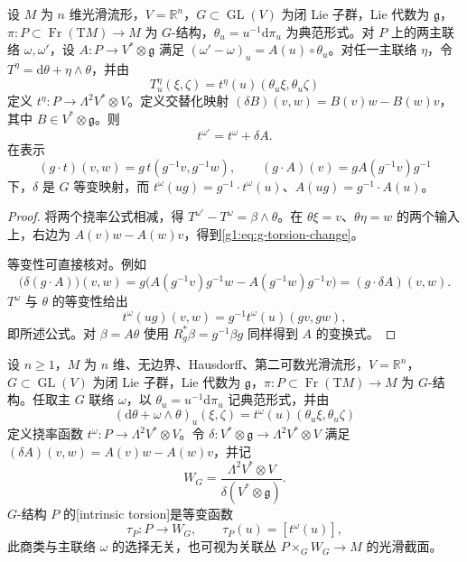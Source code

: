 \begin{proposition}
	\label{g1:prop:g-torsion-change}
	设 \(M\) 为 \(n\) 维光滑流形，\(V=\mathbb R^n\)，\(G\subset\operatorname{GL}(V)\) 为闭 Lie 子群，Lie 代数为 \(\mathfrak g\)，\(\pi:P\subset\operatorname{Fr}(\mathrm TM)\to M\) 为 \(G\)-结构，\(\theta_u=u^{-1}\mathrm d\pi_u\) 为典范形式。对 \(P\) 上的两主联络 \(\omega,\omega'\)，设 \(A:P\to V^*\otimes\mathfrak g\) 满足 \((\omega'-\omega)_u=A(u)\circ\theta_u\)。对任一主联络 \(\eta\)，令 \(T^\eta=\mathrm d\theta+\eta\wedge\theta\)，并由
	\[
		T^\eta_u(\xi,\zeta)=t^\eta(u)(\theta_u\xi,\theta_u\zeta)
	\]
	定义 \(t^\eta:P\to\Lambda^2V^*\otimes V\)。定义交替化映射 \((\delta B)(v,w)=B(v)w-B(w)v\)，其中 \(B\in V^*\otimes\mathfrak g\)。则
	\begin{equation}
		\label{g1:eq:g-torsion-change}
		t^{\omega'}=t^\omega+\delta A.
	\end{equation}
	在表示
	\[
		(g\cdot t)(v,w)=g\,t(g^{-1}v,g^{-1}w),
		\qquad
		(g\cdot A)(v)=g A(g^{-1}v)g^{-1}
	\]
	下，\(\delta\) 是 \(G\) 等变映射，而 \(t^\omega(ug)=g^{-1}\cdot t^\omega(u)\)、\(A(ug)=g^{-1}\cdot A(u)\)。
\end{proposition}
\begin{proof}
	将两个挠率公式相减，得 \(T^{\omega'}-T^\omega=\beta\wedge\theta\)。在 \(\theta\xi=v\)、\(\theta\eta=w\) 的两个输入上，右边为 \(A(v)w-A(w)v\)，得到\eqref{g1:eq:g-torsion-change}。

	等变性可直接核对。例如
	\[
		\bigl(\delta(g\cdot A)\bigr)(v,w)
		=g\bigl(A(g^{-1}v)g^{-1}w-A(g^{-1}w)g^{-1}v\bigr)
		=(g\cdot\delta A)(v,w).
	\]
	\(T^\omega\) 与 \(\theta\) 的等变性给出
	\[
		t^\omega(ug)(v,w)=g^{-1}t^\omega(u)(gv,gw),
	\]
	即所述公式。对 \(\beta=A\theta\) 使用 \(R_g^*\beta=g^{-1}\beta g\) 同样得到 \(A\) 的变换式。
\end{proof}

\begin{definition}
	\label{g1:def:intrinsic-torsion}
	设 \(n\ge1\)，\(M\) 为 \(n\) 维、无边界、Hausdorff、第二可数光滑流形，\(V=\mathbb R^n\)，\(G\subset\operatorname{GL}(V)\) 为闭 Lie 子群，Lie 代数为 \(\mathfrak g\)，\(\pi:P\subset\operatorname{Fr}(\mathrm TM)\to M\) 为 \(G\)-结构。任取主 \(G\) 联络 \(\omega\)，以 \(\theta_u=u^{-1}\mathrm d\pi_u\) 记典范形式，并由
	\[
		(\mathrm d\theta+\omega\wedge\theta)_u(\xi,\zeta)
		=t^\omega(u)(\theta_u\xi,\theta_u\zeta)
	\]
	定义挠率函数 \(t^\omega:P\to\Lambda^2V^*\otimes V\)。令 \(\delta:V^*\otimes\mathfrak g\to\Lambda^2V^*\otimes V\) 满足 \((\delta A)(v,w)=A(v)w-A(w)v\)，并记
	\[
		W_G=\frac{\Lambda^2V^*\otimes V}{\delta(V^*\otimes\mathfrak g)}.
	\]
	\(G\)-结构 \(P\) 的[intrinsic torsion]是等变函数
	\[
		\tau_P:P\longrightarrow W_G,\qquad
		\tau_P(u)=[t^\omega(u)],
	\]
	此商类与主联络 \(\omega\) 的选择无关，也可视为关联丛 \(P\times_G W_G\to M\) 的光滑截面。
\end{definition}

